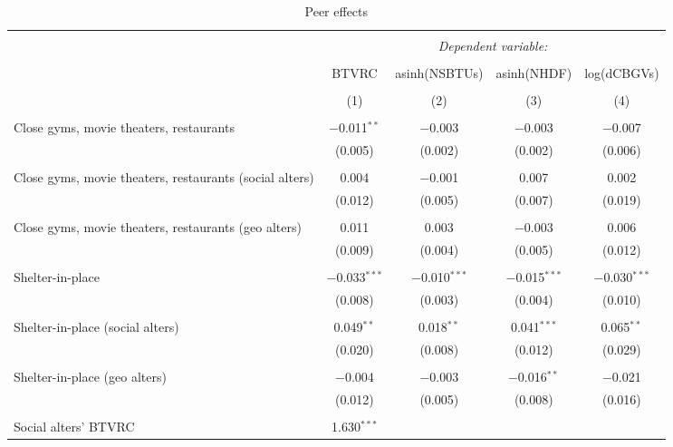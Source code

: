 
\begin{table}[!htbp] \centering 
  \caption{Peer effects} 
  \label{tab:iv} 
\footnotesize 
\begin{tabular}{@{\extracolsep{5pt}}lcccc} 
\\[-1.8ex]\hline 
\hline \\[-1.8ex] 
 & \multicolumn{4}{c}{\textit{Dependent variable:}} \\ 
\cline{2-5} 
\\[-1.8ex] & BTVRC & asinh(NSBTUs) & asinh(NHDF) & log(dCBGVs) \\ 
\\[-1.8ex] & (1) & (2) & (3) & (4)\\ 
\hline \\[-1.8ex] 
 Close gyms, movie theaters, restaurants & $-$0.011$^{**}$ & $-$0.003 & $-$0.003 & $-$0.007 \\ 
  & (0.005) & (0.002) & (0.002) & (0.006) \\ 
  & & & & \\ 
 Close gyms, movie theaters, restaurants (social alters) & 0.004 & $-$0.001 & 0.007 & 0.002 \\ 
  & (0.012) & (0.005) & (0.007) & (0.019) \\ 
  & & & & \\ 
 Close gyms, movie theaters, restaurants (geo alters) & 0.011 & 0.003 & $-$0.003 & 0.006 \\ 
  & (0.009) & (0.004) & (0.005) & (0.012) \\ 
  & & & & \\ 
 Shelter-in-place & $-$0.033$^{***}$ & $-$0.010$^{***}$ & $-$0.015$^{***}$ & $-$0.030$^{***}$ \\ 
  & (0.008) & (0.003) & (0.004) & (0.010) \\ 
  & & & & \\ 
 Shelter-in-place (social alters) & 0.049$^{**}$ & 0.018$^{**}$ & 0.041$^{***}$ & 0.065$^{**}$ \\ 
  & (0.020) & (0.008) & (0.012) & (0.029) \\ 
  & & & & \\ 
 Shelter-in-place (geo alters) & $-$0.004 & $-$0.003 & $-$0.016$^{**}$ & $-$0.021 \\ 
  & (0.012) & (0.005) & (0.008) & (0.016) \\ 
  & & & & \\ 
 Social alters' BTVRC & 1.630$^{***}$ &  &  &  \\ 

\end{tabular}
\end{table}
